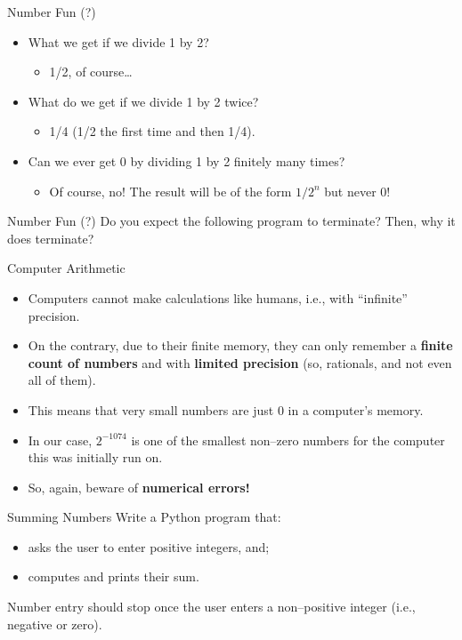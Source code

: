 \documentclass[aspectratio=169, 12pt, xcolor=table]{beamer}
\begin{document}
	\begin{frame}{Number Fun (?)}
		\begin{itemize}
			\item What we get if we divide 1 by 2?\pause
			\begin{itemize}
				\item 1/2, of course\ldots\pause
			\end{itemize}
			\item What do we get if we divide 1 by 2 twice?\pause
			\begin{itemize}
				\item 1/4 (1/2 the first time and then 1/4).\pause
			\end{itemize}
			\item Can we ever get 0 by dividing 1 by 2 finitely many times?\pause
			\begin{itemize}
				\item Of course, no! The result will be of the form $1/2^n$ but never 0!
			\end{itemize}
		\end{itemize}
	\end{frame}

	\begin{frame}{Number Fun (?)}
		Do you expect the following program to terminate?
		\pause
		Then, why it does terminate?
	\end{frame}

	\begin{headsup}{Computer Arithmetic}
		\begin{itemize}
			\item Computers cannot make calculations like humans, i.e., with ``infinite'' precision.
			\item On the contrary, due to their finite memory, they can only remember a \textbf{finite count of numbers} and with \textbf{limited precision} (so, rationals, and not even all of them).
			\item This means that very small numbers are just 0 in a computer's memory.
			\item In our case, $2^{-1074}$ is one of the smallest non--zero numbers for the computer this was initially run on.
			\item So, again, beware of \textbf{numerical errors!}
		\end{itemize}
	\end{headsup}

	\begin{frame}{Summing Numbers}
		Write a Python program that:
		\begin{itemize}
			\item asks the user to enter positive integers, and;
			\item computes and prints their sum.
		\end{itemize}
		Number entry should stop once the user enters a non--positive integer (i.e., negative or zero).
	\end{frame}
\end{document}
